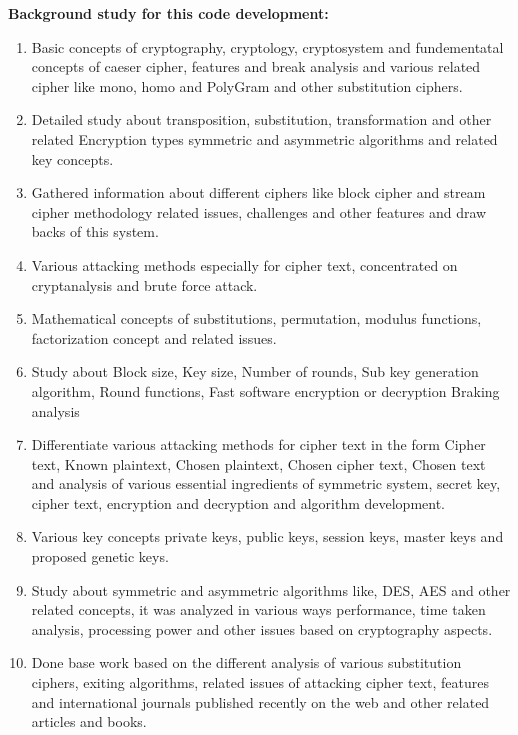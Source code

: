 \documentclass[a4paper, 12pt, notitlepage]{report}
\begin{document}
\begin{block}{\textbf{Background study for this code development:}}
\begin{enumerate}
  \item {
    Basic concepts of cryptography, cryptology, 
cryptosystem and fundementatal concepts of caeser 
cipher, features and break analysis and various related 
cipher like mono, homo and PolyGram and other 
substitution ciphers.
  }
	\item {
		Detailed study about transposition, substitution, 
transformation and other related Encryption types 
symmetric and asymmetric algorithms and related key 
concepts.  
  }
	\item {
   Gathered information about different ciphers like 
block cipher and stream cipher methodology related 
issues, challenges and other features and draw backs 
of this system. }
\item Various attacking methods especially for cipher text, 
concentrated on cryptanalysis and brute force attack.
\item Mathematical concepts of substitutions, permutation, 
modulus functions, factorization concept and related 
issues. 
\item Study about Block size, Key size, Number of rounds, 
Sub key generation algorithm, Round functions, Fast 
software encryption or decryption Braking analysis  
\item Differentiate various attacking methods for cipher text 
in the form Cipher text, Known plaintext, Chosen 
plaintext, Chosen cipher text, Chosen text and 
analysis of various essential ingredients of symmetric 
system, secret key, cipher text, encryption and 
decryption and algorithm development.  
\item Various key concepts private keys, public keys, 
session keys, master keys and proposed genetic keys. 
\item Study about symmetric and asymmetric algorithms 
like, DES, AES and other related concepts, it was analyzed in various ways performance, time taken 
analysis, processing power and other issues based on 
cryptography aspects.
\item Done base work based on the different analysis of 
various substitution ciphers, exiting algorithms, 
related issues of attacking cipher text, features and 
international journals published recently on the web 
and other related articles and books.
  \end{enumerate}
\end{block}\\
\end{document}
